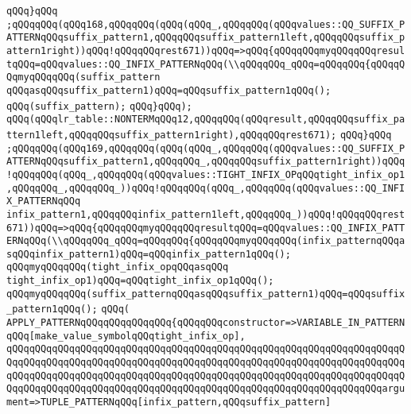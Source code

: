 \verb|qQQq}qQQq|\newline
\verb|;qQQqqQQq(qQQq168,qQQqqQQq(qQQq(qQQq_,qQQqqQQq(qQQqvalues::QQ_SUFFIX_PATTERNqQQqsuffix_pattern1,qQQqqQQqsuffix_pattern1left,qQQqqQQqsuffix_pattern1right))qQQq!qQQqqQQqrest671))qQQq=>qQQq{qQQqqQQqmyqQQqqQQqresultqQQq=qQQqvalues::QQ_INFIX_PATTERNqQQq(\\qQQqqQQq_qQQq=qQQqqQQq{qQQqqQQqmyqQQqqQQq(suffix_pattern|\newline
\verb|qQQqasqQQqsuffix_pattern1)qQQq=qQQqsuffix_pattern1qQQq();|\newline
\verb|qQQq(suffix_pattern);|\newline
\verb|qQQq}qQQq);|\newline
\verb|qQQq(qQQqlr_table::NONTERMqQQq12,qQQqqQQq(qQQqresult,qQQqqQQqsuffix_pattern1left,qQQqqQQqsuffix_pattern1right),qQQqqQQqrest671);|\newline
\verb|qQQq}qQQq|\newline
\verb|;qQQqqQQq(qQQq169,qQQqqQQq(qQQq(qQQq_,qQQqqQQq(qQQqvalues::QQ_SUFFIX_PATTERNqQQqsuffix_pattern1,qQQqqQQq_,qQQqqQQqsuffix_pattern1right))qQQq!qQQqqQQq(qQQq_,qQQqqQQq(qQQqvalues::TIGHT_INFIX_OPqQQqtight_infix_op1,qQQqqQQq_,qQQqqQQq_))qQQq!qQQqqQQq(qQQq_,qQQqqQQq(qQQqvalues::QQ_INFIX_PATTERNqQQq|\newline
\verb|infix_pattern1,qQQqqQQqinfix_pattern1left,qQQqqQQq_))qQQq!qQQqqQQqrest671))qQQq=>qQQq{qQQqqQQqmyqQQqqQQqresultqQQq=qQQqvalues::QQ_INFIX_PATTERNqQQq(\\qQQqqQQq_qQQq=qQQqqQQq{qQQqqQQqmyqQQqqQQq(infix_patternqQQqasqQQqinfix_pattern1)qQQq=qQQqinfix_pattern1qQQq();|\newline
\verb|qQQqmyqQQqqQQq(tight_infix_opqQQqasqQQq|\newline
\verb|tight_infix_op1)qQQq=qQQqtight_infix_op1qQQq();|\newline
\verb|qQQqmyqQQqqQQq(suffix_patternqQQqasqQQqsuffix_pattern1)qQQq=qQQqsuffix_pattern1qQQq();|\newline
\verb|qQQq(|\newline
\verb|APPLY_PATTERNqQQqqQQqqQQqqQQq{qQQqqQQqconstructor=>VARIABLE_IN_PATTERNqQQq[make_value_symbolqQQqtight_infix_op],|\newline
\verb|qQQqqQQqqQQqqQQqqQQqqQQqqQQqqQQqqQQqqQQqqQQqqQQqqQQqqQQqqQQqqQQqqQQqqQQqqQQqqQQqqQQqqQQqqQQqqQQqqQQqqQQqqQQqqQQqqQQqqQQqqQQqqQQqqQQqqQQqqQQqqQQqqQQqqQQqqQQqqQQqqQQqqQQqqQQqqQQqqQQqqQQqqQQqqQQqqQQqqQQqqQQqqQQqqQQqqQQqqQQqqQQqqQQqqQQqqQQqqQQqqQQqqQQqqQQqqQQqqQQqqQQqqQQqqQQqqQQqargument=>TUPLE_PATTERNqQQq[infix_pattern,qQQqsuffix_pattern]|\newline
